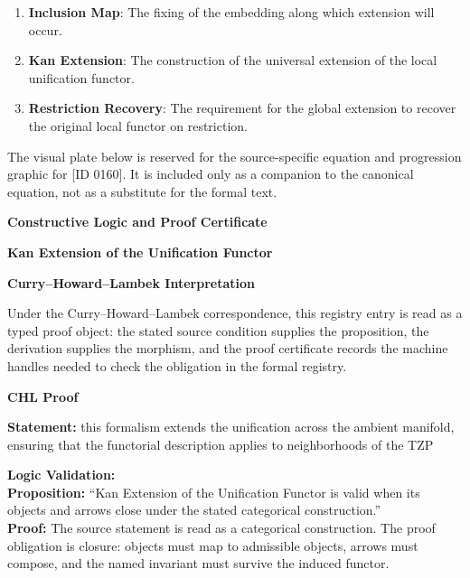 \begin{enumerate}[leftmargin=1.6em,itemsep=6pt,topsep=4pt]
\item \textbf{Inclusion Map}: The fixing of the embedding along which extension will occur.
\item \textbf{Kan Extension}: The construction of the universal extension of the local unification functor.
\item \textbf{Restriction Recovery}: The requirement for the global extension to recover the original local functor on restriction.
\end{enumerate}

\begingroup\footnotesize\sloppy
The visual plate below is reserved for the source-specific equation and progression graphic for [ID 0160]. It is included only as a companion to the canonical equation, not as a substitute for the formal text.
\par\endgroup
\ifTZPDarkEdition
{}
\fi

\clearpage
\begingroup\tzpsupportsetup
\noindent\textbf{\fontsize{10.8pt}{12.8pt}\selectfont [ID 0160] Constructive Logic and Proof Certificate}\par
\noindent\textbf{\fontsize{10pt}{12pt}\selectfont Kan Extension of the Unification Functor}\par
\vspace{0.45em}
\begingroup
\footnotesize
\setlength{\parskip}{0.22em}
\setlength{\parindent}{0pt}
\noindent\textbf{Curry--Howard--Lambek Interpretation}\par
Under the Curry--Howard--Lambek correspondence, this registry entry is read as a typed proof
object: the stated source condition supplies the proposition, the derivation supplies the
morphism, and the proof certificate records the machine handles needed to check the obligation
in the formal registry.

\vspace{0.45em}
\noindent\textbf{CHL Proof}\par
\textbf{Statement:} this formalism extends the unification across the ambient manifold, ensuring that the
functorial description applies to neighborhoods of the TZP

\textbf{Logic Validation:}\\
\textbf{Proposition:} ``Kan Extension of the Unification Functor is valid when its objects and arrows close
under the stated categorical construction.''\\
\textbf{Proof:} The source statement is read as a categorical construction. The proof obligation is
closure: objects must map to admissible objects, arrows must compose, and the named
invariant must survive the induced functor.

